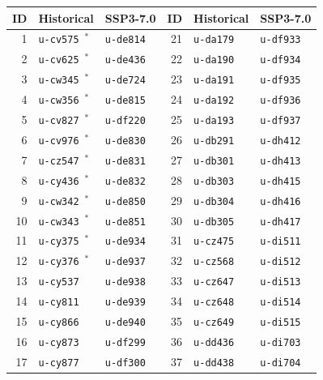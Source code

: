 \documentclass[11pt,a4paper]{article}
\begin{document}
\begin{table}
\renewcommand{\arraystretch}{1.1} %
\begin{tabular}{r l l | r l l}
\textbf{ID} & \textbf{Historical} & \textbf{SSP3-7.0} & \textbf{ID} & \textbf{Historical} & \textbf{SSP3-7.0} \\ \hline
1  & \texttt{\colorbox{blue!20}{u-cv575}}~$^*$ & \texttt{\colorbox{blue!20}{u-de814}} & 21 & \texttt{u-da179} & \texttt{u-df933} \\
2  & \texttt{u-cv625}~$^*$ & \texttt{u-de436} & 22 & \texttt{u-da190} & \texttt{u-df934} \\
3  & \texttt{u-cw345}~$^*$ & \texttt{u-de724} & 23 & \texttt{u-da191} & \texttt{u-df935} \\
4  & \texttt{u-cw356}~$^*$ & \texttt{u-de815} & 24 & \texttt{u-da192} & \texttt{u-df936} \\
5  & \texttt{u-cv827}~$^*$ & \texttt{u-df220} & 25 & \texttt{u-da193} & \texttt{u-df937} \\
6  & \texttt{u-cv976}~$^*$ & \texttt{u-de830} & 26 & \texttt{u-db291} & \texttt{u-dh412} \\
7  & \texttt{u-cz547}~$^*$ & \texttt{u-de831} & 27 & \texttt{u-db301} & \texttt{u-dh413} \\
8  & \texttt{u-cy436}~$^*$ & \texttt{u-de832} & 28 & \texttt{u-db303} & \texttt{u-dh415} \\
9  & \texttt{u-cw342}~$^*$ & \texttt{u-de850} & 29 & \texttt{u-db304} & \texttt{u-dh416} \\
10 & \texttt{u-cw343}~$^*$ & \texttt{u-de851} & 30 & \texttt{u-db305} & \texttt{u-dh417} \\
11 & \texttt{u-cy375}~$^*$ & \texttt{u-de934} & 31 & \texttt{u-cz475} & \texttt{u-di511} \\
12 & \texttt{u-cy376}~$^*$ & \texttt{u-de937} & 32 & \texttt{u-cz568} & \texttt{u-di512} \\
13 & \texttt{\colorbox{blue!20}{u-cy537}} & \texttt{u-de938} & 33 & \texttt{u-cz647} & \texttt{u-di513} \\
14 & \texttt{u-cy811} & \texttt{u-de939} & 34 & \texttt{u-cz648} & \texttt{u-di514} \\
15 & \texttt{u-cy866} & \texttt{u-de940} & 35 & \texttt{u-cz649} & \texttt{u-di515} \\
16 & \texttt{u-cy873} & \texttt{u-df299} & 36 & \texttt{u-dd436} & \texttt{u-di703} \\
17 & \texttt{u-cy877} & \texttt{u-df300} & 37 & \texttt{u-dd438} & \texttt{u-di704} \\

\end{tabular}
\end{table}
\end{document}
